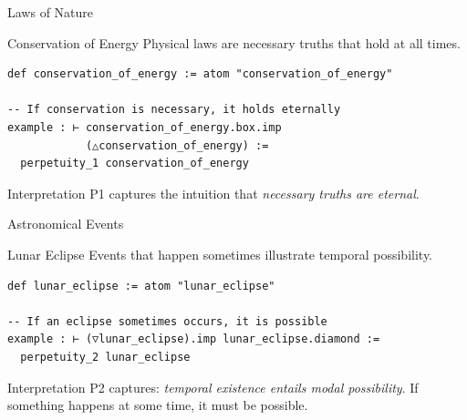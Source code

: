 \documentclass[aspectratio=169,11pt]{beamer}
\begin{document}
\begin{frame}[fragile]{Laws of Nature}

\begin{block}{Conservation of Energy}
Physical laws are necessary truths that hold at all times.
\end{block}

\begin{lstlisting}
def conservation_of_energy := atom "conservation_of_energy"

-- If conservation is necessary, it holds eternally
example : ⊢ conservation_of_energy.box.imp
            (△conservation_of_energy) :=
  perpetuity_1 conservation_of_energy
\end{lstlisting}

\vspace{0.3cm}

\begin{block}{Interpretation}
P1 captures the intuition that \emph{necessary truths are eternal}.
\end{block}

\end{frame}

\begin{frame}[fragile]{Astronomical Events}

\begin{block}{Lunar Eclipse}
Events that happen sometimes illustrate temporal possibility.
\end{block}

\begin{lstlisting}
def lunar_eclipse := atom "lunar_eclipse"

-- If an eclipse sometimes occurs, it is possible
example : ⊢ (▽lunar_eclipse).imp lunar_eclipse.diamond :=
  perpetuity_2 lunar_eclipse
\end{lstlisting}

\vspace{0.3cm}

\begin{block}{Interpretation}
P2 captures: \emph{temporal existence entails modal possibility}.
If something happens at some time, it must be possible.
\end{block}

\end{frame}
\end{document}
